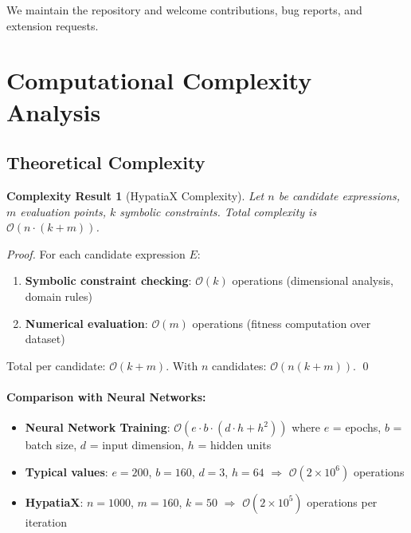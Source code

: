 \documentclass[11pt,a4paper]{article}
\newtheorem{complexity}{Complexity Result}
\begin{document}
We maintain the repository and welcome contributions, bug reports, and extension requests.



\section{Computational Complexity Analysis}
\label{app:complexity}

\subsection{Theoretical Complexity}

\begin{complexity}[HypatiaX Complexity]
Let $n$ be candidate expressions, $m$ evaluation points, $k$ symbolic constraints. Total complexity is $\mathcal{O}(n \cdot (k + m))$.
\end{complexity}

\begin{proof}
For each candidate expression $E$:
\begin{enumerate}
\item \textbf{Symbolic constraint checking}: $\mathcal{O}(k)$ operations (dimensional analysis, domain rules)
\item \textbf{Numerical evaluation}: $\mathcal{O}(m)$ operations (fitness computation over dataset)
\end{enumerate}

Total per candidate: $\mathcal{O}(k + m)$. With $n$ candidates: $\mathcal{O}(n(k + m))$. \qed
\end{proof}

\paragraph{Comparison with Neural Networks:}
\begin{itemize}
\item \textbf{Neural Network Training}: $\mathcal{O}(e \cdot b \cdot (d \cdot h + h^2))$ where $e$ = epochs, $b$ = batch size, $d$ = input dimension, $h$ = hidden units
\item \textbf{Typical values}: $e=200$, $b=160$, $d=3$, $h=64$ $\Rightarrow$ $\mathcal{O}(2 \times 10^6)$ operations
\item \textbf{HypatiaX}: $n=1000$, $m=160$, $k=50$ $\Rightarrow$ $\mathcal{O}(2 \times 10^5)$ operations per iteration
\end{itemize}
\end{document}

